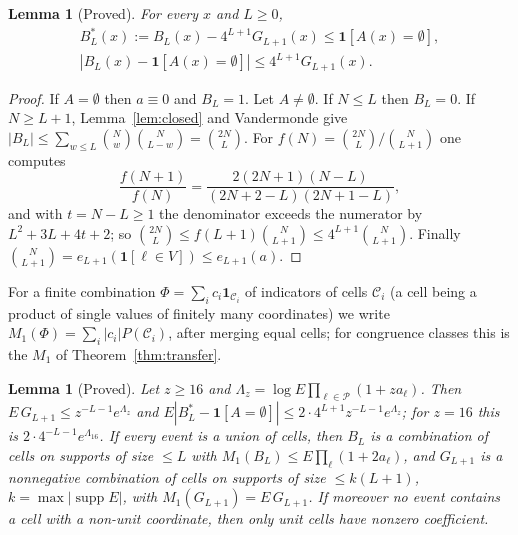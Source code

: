 \documentclass[11pt,reqno]{amsart}
\newtheorem{lemma}[theorem]{Lemma}
\theoremstyle{definition}
\newcommand{\supp}{\operatorname{supp}}
\begin{document}
\begin{lemma}[Proved]\label{lem:pointwise}
For every $x$ and $L\ge0$,
\begin{gather*}
 B^*_L(x):=B_L(x)-4^{L+1}G_{L+1}(x)\le\mathbf 1[A(x)=\emptyset],\\
 |B_L(x)-\mathbf 1[A(x)=\emptyset]|\le4^{L+1}G_{L+1}(x).
\end{gather*}
\end{lemma}

\begin{proof}
If $A=\emptyset$ then $a\equiv0$ and $B_L=1$.  Let $A\ne\emptyset$.  If $N\le L$
then $B_L=0$.  If $N\ge L+1$, Lemma~\ref{lem:closed} and Vandermonde give
$|B_L|\le\sum_{w\le L}\binom Nw\binom N{L-w}=\binom{2N}L$.  For
$f(N)=\binom{2N}L/\binom N{L+1}$ one computes
\[
 \frac{f(N+1)}{f(N)}=\frac{2(2N+1)(N-L)}{(2N+2-L)(2N+1-L)},
\]
and with $t=N-L\ge1$ the denominator exceeds the numerator by
$L^2+3L+4t+2$; so
$\binom{2N}L\le f(L+1)\binom N{L+1}\le4^{L+1}\binom N{L+1}$.  Finally
$\binom N{L+1}=e_{L+1}(\mathbf 1[\ell\in V])\le e_{L+1}(a)$.
\end{proof}

For a finite combination $\Phi=\sum_ic_i\mathbf 1_{\mathcal C_i}$ of indicators of
cells $\mathcal C_i$ (a cell being a product of single values of finitely many
coordinates) we write $M_1(\Phi)=\sum_i|c_i|P(\mathcal C_i)$, after merging equal
cells; for congruence classes this is the $M_1$ of Theorem~\ref{thm:transfer}.

\begin{lemma}[Proved]\label{lem:meanmass}
Let $z\ge16$ and $\Lambda_z=\log E\prod_{\ell\in\mathcal P}(1+za_\ell)$.  Then
$E\,G_{L+1}\le z^{-L-1}e^{\Lambda_z}$ and
$E|B^*_L-\mathbf 1[A=\emptyset]|\le2\cdot4^{L+1}z^{-L-1}e^{\Lambda_z}$; for $z=16$
this is $2\cdot4^{-L-1}e^{\Lambda_{16}}$.  If every event is a union of cells,
then $B_L$ is a combination of cells on supports of size $\le L$ with
$M_1(B_L)\le E\prod_\ell(1+2a_\ell)$, and $G_{L+1}$ is a nonnegative
combination of cells on supports of size $\le k(L+1)$, $k=\max|\supp E|$,
with $M_1(G_{L+1})=E\,G_{L+1}$.  If moreover no event contains a cell with a
non-unit coordinate, then only unit cells have nonzero coefficient.
\end{lemma}
\end{document}
